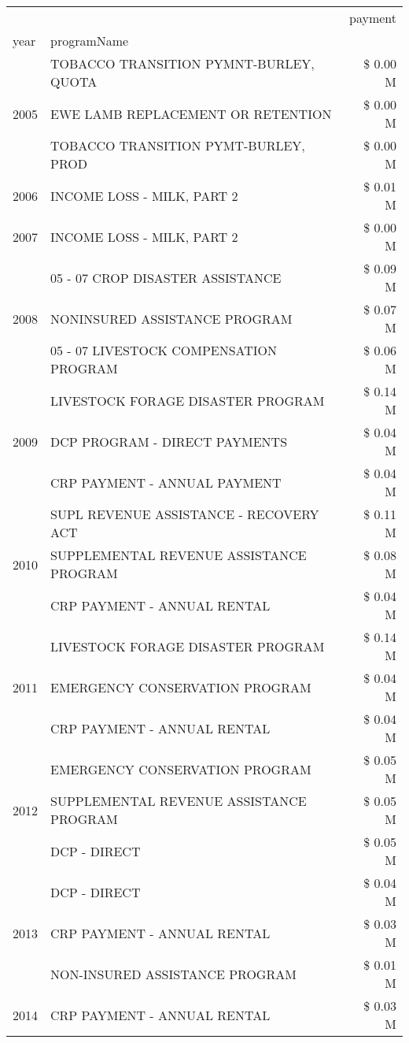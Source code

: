 \begin{tabular}{llr}
\toprule
 &  & payment \\
year & programName &  \\
\midrule
\multirow[t]{3}{*}{2005} & TOBACCO TRANSITION PYMNT-BURLEY, QUOTA & \$ 0.00 M \\
 & EWE LAMB REPLACEMENT OR RETENTION & \$ 0.00 M \\
 & TOBACCO TRANSITION PYMT-BURLEY, PROD & \$ 0.00 M \\
\cline{1-3}
2006 & INCOME LOSS - MILK, PART 2 & \$ 0.01 M \\
\cline{1-3}
2007 & INCOME LOSS - MILK, PART 2 & \$ 0.00 M \\
\cline{1-3}
\multirow[t]{3}{*}{2008} & 05 - 07 CROP DISASTER ASSISTANCE & \$ 0.09 M \\
 & NONINSURED ASSISTANCE PROGRAM & \$ 0.07 M \\
 & 05 - 07 LIVESTOCK COMPENSATION PROGRAM & \$ 0.06 M \\
\cline{1-3}
\multirow[t]{3}{*}{2009} & LIVESTOCK FORAGE DISASTER  PROGRAM & \$ 0.14 M \\
 & DCP PROGRAM - DIRECT PAYMENTS & \$ 0.04 M \\
 & CRP PAYMENT - ANNUAL PAYMENT & \$ 0.04 M \\
\cline{1-3}
\multirow[t]{3}{*}{2010} & SUPL REVENUE ASSISTANCE - RECOVERY ACT & \$ 0.11 M \\
 & SUPPLEMENTAL REVENUE ASSISTANCE PROGRAM & \$ 0.08 M \\
 & CRP PAYMENT - ANNUAL RENTAL & \$ 0.04 M \\
\cline{1-3}
\multirow[t]{3}{*}{2011} & LIVESTOCK FORAGE DISASTER PROGRAM & \$ 0.14 M \\
 & EMERGENCY CONSERVATION PROGRAM & \$ 0.04 M \\
 & CRP PAYMENT - ANNUAL RENTAL & \$ 0.04 M \\
\cline{1-3}
\multirow[t]{3}{*}{2012} & EMERGENCY CONSERVATION PROGRAM & \$ 0.05 M \\
 & SUPPLEMENTAL REVENUE ASSISTANCE PROGRAM & \$ 0.05 M \\
 & DCP - DIRECT & \$ 0.05 M \\
\cline{1-3}
\multirow[t]{3}{*}{2013} & DCP - DIRECT & \$ 0.04 M \\
 & CRP PAYMENT - ANNUAL RENTAL & \$ 0.03 M \\
 & NON-INSURED ASSISTANCE PROGRAM & \$ 0.01 M \\
\cline{1-3}
\multirow[t]{3}{*}{2014} & CRP PAYMENT - ANNUAL RENTAL & \$ 0.03 M \\

\end{tabular}
